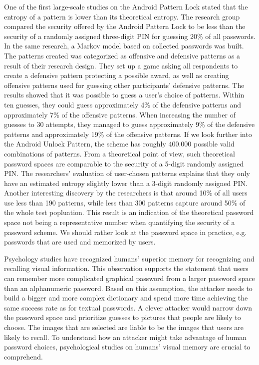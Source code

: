     One of the first large-scale studies on the Android Pattern Lock \cite{Uellenbeck} stated that the entropy of a pattern is lower than its theoretical entropy. The research group compared the security offered by the Android Pattern Lock to be less than the security of a randomly assigned three-digit PIN for guessing 20\% of all passwords. In the same research, a Markov model based on collected passwords was built. The patterns created was categorized as offensive and defensive patterns as a result of their research design. They set up a game asking all respondents to create a defensive pattern protecting a possible award, as well as creating offensive patterns used for guessing other participants' defensive patterns. The results showed that it was possible to guess a user's choice of patterns. Within ten guesses, they could guess approximately 4\% of the defensive patterns and approximately 7\% of the offensive patterns. When increasing the number of guesses to 30 attempts, they managed to guess approximately 9\% of the defensive patterns and approximately 19\% of the offensive patterns. If we look further into the Android Unlock Pattern, the scheme has roughly 400.000 possible valid combinations of patterns. From a theoretical point of view, such theoretical password spaces are comparable to the security of a 5-digit randomly assigned PIN. The researchers’ evaluation of user-chosen patterns explains that they only have an estimated entropy slightly lower than a 3-digit randomly assigned PIN. Another interesting discovery by the researchers is that around 10\% of all users use less than 190 patterns, while less than 300 patterns capture around 50\% of the whole test popluation. This result is an indication of the theoretical password space not being a representative number when quantifying the security of a password scheme. We should rather look at the password space in practice, e.g. passwords that are used and memorized by users.

    Psychology studies have recognized humans' superior memory for recognizing and recalling visual information. This observation supports the statement that users can remember more complicated graphical password from a larger password space than an alphanumeric password. Based on this assumption, the attacker needs to build a bigger and more complex dictionary and spend more time achieving the same success rate as for textual passwords. A clever attacker would narrow down the password space and prioritize guesses to pictures that people are likely to choose. The images that are selected are liable to be the images that users are likely to recall. To understand how an attacker might take advantage of human password choices, psychological studies on humans' visual memory are crucial to comprehend.
